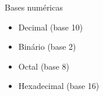 
\begin{frame}{Bases numéricas}
    \begin{itemize}
        \item Decimal (base 10)
        \item Binário (base 2)
        \item Octal (base 8)
        \item Hexadecimal (base 16)
    \end{itemize}

\end{frame}